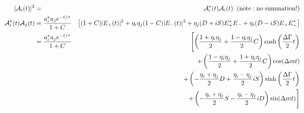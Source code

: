 \documentclass[a4paper,9pt,twoside]{article}
\begin{document}
\begin{eqnarray}
   |{\cal A}_i(t)|^2  &=& {\cal A}_i^*(t){\cal A}_i(t) \;\; (\mathrm{note: no\; summation!}) \\
  {\cal A}_i^*(t) {\cal A}_j(t) &= \frac{ a_i^* a_j e^{-t/\tau}} {1+C}&\left[ (1+C) |E_+(t)|^2  +\eta_i\eta_j (1-C)|E_-(t)|^2 + \eta_j(D+iS)E_+^*E_-+\eta_i(D-iS)E_+E_-^*   \right] \\
                                &= \frac{ a_i^* a_j e^{-t/\tau}} {1+C}&\Biggl[ \left( \frac{1+\eta_i\eta_j}{2} +  \frac{1-\eta_i\eta_j}{2}C\right) \cosh\left(\frac{\Delta\Gamma}{2}t\right) \\
                                                                          &&  +\left( \frac{1-\eta_i\eta_j}{2} +  \frac{1+\eta_i\eta_j}{2}C\right) \cos(\Delta m t) \\
                                                                          &&  +\left(-\frac{\eta_i+\eta_j}{2}D + \frac{\eta_i-\eta_j}{2}iS\right) \sinh\left(\frac{\Delta\Gamma}{2}t\right) \\
                                                                          &&  +\left(-\frac{\eta_i+\eta_j}{2}S - \frac{\eta_i-\eta_j}{2}iD\right) \sin(\Delta m t) \Biggr] 
\end{eqnarray}
\end{document}
